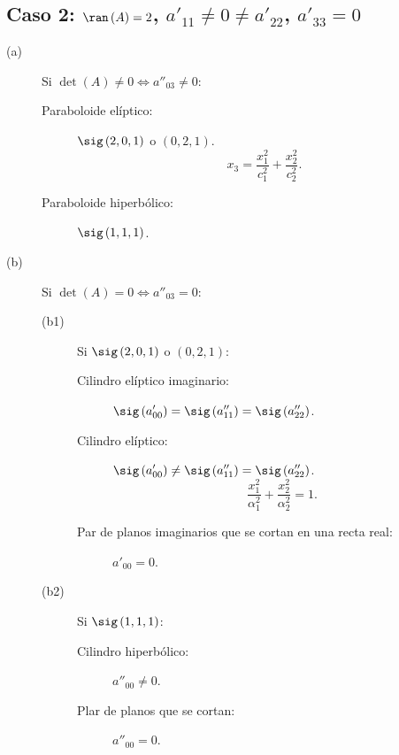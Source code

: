 \subsection*{Caso 2: $\displaystyle \ran\left(A\right) = 2 $, $\displaystyle a'_{11}\neq 0 \neq a'_{22} $, $\displaystyle a'_{33} = 0 $}
\begin{description}
\item[(a)] Si $\displaystyle \det\left(A\right) \neq 0 \iff a''_{03} \neq 0 $:
	\begin{description}
	\item[Paraboloide elíptico:] $\displaystyle \sig\left(2, 0, 1\right) $ o $\displaystyle \left(0, 2, 1\right) $. 
		\[x_{3} = \frac{x^{2}_{1}}{c_{1}^{2}}+\frac{x^{2}_{2}}{c^{2}_{2}} .\]
	\item[Paraboloide hiperbólico:] $\displaystyle \sig\left(1,1,1\right) $.
	\end{description}
\item[(b)] Si $\displaystyle \det\left(A\right) = 0 \iff a''_{03} = 0 $:
	\begin{description}
	\item[(b1)] Si $\displaystyle \sig\left(2, 0, 1\right) $ o $\displaystyle \left(0, 2, 1\right) $:
		\begin{description}
		\item[Cilindro elíptico imaginario:] $\displaystyle \sig\left(a'_{00}\right) = \sig\left(a''_{11}\right) = \sig\left(a''_{22}\right) $. 
		\item[Cilindro elíptico:] $\displaystyle \sig\left(a'_{00}\right) \neq \sig\left(a''_{11}\right) = \sig\left(a''_{22}\right) $. 
			\[\frac{x^{2}_{1}}{\alpha^{2}_{1}}+\frac{x^{2}_{2}}{\alpha_{2}^{2}} = 1 .\]
		\item[Par de planos imaginarios que se cortan en una recta real:] $\displaystyle a'_{00} = 0 $.
		\end{description}
	\item[(b2)] Si $\displaystyle \sig\left(1,1,1\right) $:
		\begin{description}
		\item[Cilindro hiperbólico:] $\displaystyle a''_{00} \neq 0 $.
		\item[Plar de planos que se cortan:] $\displaystyle a''_{00} = 0 $.
		\end{description}
	\end{description}
\end{description}
